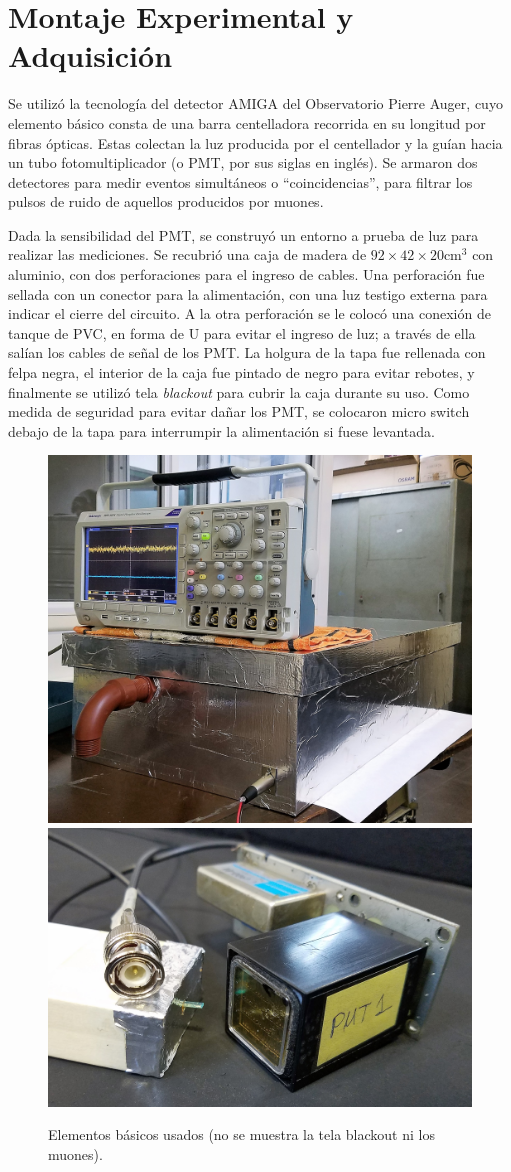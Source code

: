 \documentclass[12pt,a4paper]{article}
\numberwithin{equation}{section}
\begin{document}
\section{Montaje Experimental y Adquisición}

Se utilizó la tecnología del detector AMIGA del Observatorio Pierre Auger\cite{pierreauger}, cuyo elemento básico consta de una barra centelladora recorrida en su longitud por fibras ópticas. Estas colectan la luz producida por el centellador y la guían
hacia un tubo fotomultiplicador (o PMT, por sus siglas en inglés). Se armaron dos detectores para medir eventos simultáneos o ``coincidencias'', para filtrar los pulsos de ruido de aquellos producidos por muones.

Dada la sensibilidad del PMT, se construyó un entorno a prueba de luz para realizar las mediciones. Se recubrió una caja de madera de $ 92\times42\times20\text{cm}^3$ con aluminio, con dos perforaciones para el ingreso de cables. Una perforación fue sellada con un conector para la alimentación, con una luz testigo externa para indicar el cierre del circuito. A la otra perforación se le colocó una conexión de tanque de PVC, en forma de U para evitar el ingreso de luz; a través de ella salían los cables de señal de los PMT. La holgura de la tapa fue rellenada con felpa negra, el interior de la caja fue pintado de negro para evitar rebotes, y finalmente se utilizó tela \textit{blackout} para cubrir la caja durante su uso. Como medida de seguridad para evitar dañar los PMT, se colocaron micro switch debajo de la tapa para interrumpir la alimentación si fuese levantada. 

\begin{figure}[h]
	\centering
	\includegraphics[width=.38\linewidth]{imgs/caja.jpg}
	\includegraphics[width=.5\linewidth]{imgs/detector.jpg}
	\caption{Elementos básicos usados (no se muestra la tela blackout ni los muones).}
	\label{fig:setup}
\end{figure}
\end{document}
